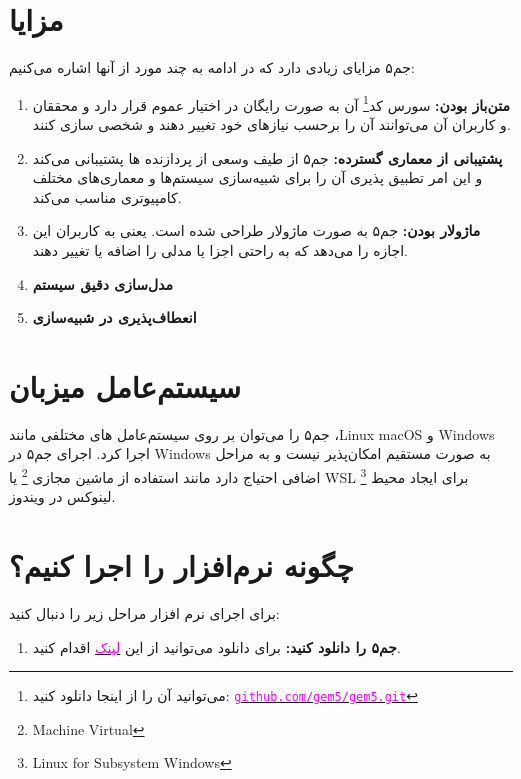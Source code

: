 \documentclass[12pt]{exam}
\begin{document}
\begin{multicols}{2}
	
	
	\section{مزایا}
	جم۵ مزایای زیادی دارد که در ادامه به چند مورد از آنها اشاره می‌کنیم:
	\begin{enumerate}[label=\Roman*.]
		\item \textbf{متن‌باز بودن: }سورس کد\footnote{می‌توانید آن را از اینجا دانلود کنید: \texttt{\href{https://github.com/gem5/gem5.git}{\textcolor{magenta}{github.com/gem5/gem5.git}}}}
		آن به صورت رایگان در اختیار عموم قرار دارد و محققان و کاربران آن می‌توانند آن را برحسب نیاز‌های خود تغییر دهند و شخصی سازی کنند.
		
		\item \textbf{پشتیبانی از معماری گسترده: }جم۵ از طیف وسعی از پردازنده ها پشتیبانی می‌کند و این امر تطبیق پذیری آن را برای شبیه‌سازی سیستم‌ها و معماری‌های مختلف کامپیوتری مناسب می‌کند.
		
		\item \textbf{ماژولار بودن: }جم۵ به صورت ماژولار طراحی شده است. یعنی به کاربران این اجازه را می‌دهد که به راحتی اجزا یا مدلی را اضافه یا تغییر دهند. 
		
		\item \textbf{مدل‌سازی دقیق سیستم}
		
		\item \textbf{انعطاف‌پذیری در شبیه‌سازی}
		
	\end{enumerate}
	
	
	
	\section{سیستم‌عامل میزبان}
	جم۵ را می‌توان بر روی سیستم‌عامل های مختلفی مانند ،Linux macOS و Windows اجرا کرد. اجرای جم۵ در Windows به صورت مستقیم امکان‌پذیر نیست و به مراحل اضافی احتیاج دارد مانند استفاده از ماشین مجازی \footnote{Machine Virtual} یا WSL \footnote{Linux for Subsystem Windows} برای ایجاد محیط لینوکس در ویندوز.
	
	
	
	\section{چگونه نرم‌افزار را اجرا کنیم؟}
	برای اجرای نرم افزار مراحل زیر را دنبال کنید:
	\begin{enumerate}
		\item \textbf{جم۵ را دانلود کنید: }برای دانلود می‌توانید از این
		\href{https://github.com/gem5/gem5}{\textcolor{magenta}{لینک}} اقدام کنید.
		

\end{enumerate}
\end{multicols}
\end{document}
